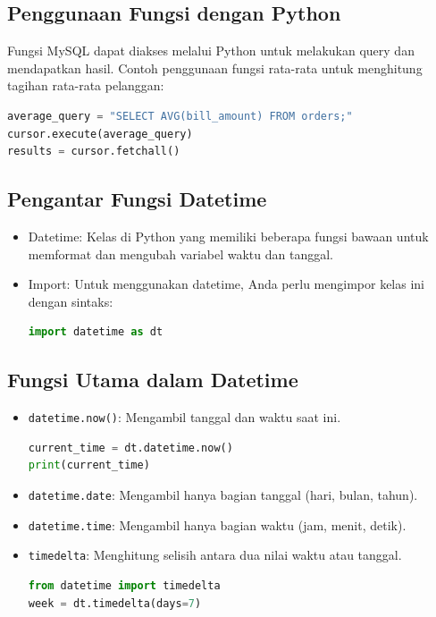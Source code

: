 \documentclass{article}
\begin{document}
\subsection{Penggunaan Fungsi dengan Python}
Fungsi MySQL dapat diakses melalui Python untuk melakukan query dan mendapatkan hasil. Contoh penggunaan fungsi rata-rata untuk menghitung tagihan rata-rata pelanggan:
\begin{lstlisting}[language=Python, caption={}, captionpos=b]
average_query = "SELECT AVG(bill_amount) FROM orders;"
cursor.execute(average_query)
results = cursor.fetchall()
\end{lstlisting}

\subsection{Pengantar Fungsi Datetime}
\begin{itemize}
      \item Datetime: Kelas di Python yang memiliki beberapa fungsi bawaan untuk memformat dan mengubah variabel waktu dan tanggal.
      \item Import: Untuk menggunakan datetime, Anda perlu mengimpor kelas ini dengan sintaks:
            \begin{lstlisting}[language=Python, caption={}, captionpos=b]
import datetime as dt
\end{lstlisting}
\end{itemize}

\subsection{Fungsi Utama dalam Datetime}
\begin{itemize}
      \item \verb|datetime.now()|: Mengambil tanggal dan waktu saat ini.
            \begin{lstlisting}[language=Python, caption={}, captionpos=b]
current_time = dt.datetime.now()
print(current_time)
\end{lstlisting}
      \item \verb|datetime.date|: Mengambil hanya bagian tanggal (hari, bulan, tahun).
      \item \verb|datetime.time|: Mengambil hanya bagian waktu (jam, menit, detik).
      \item \verb|timedelta|: Menghitung selisih antara dua nilai waktu atau tanggal.
            \begin{lstlisting}[language=Python, caption={}, captionpos=b]
from datetime import timedelta
week = dt.timedelta(days=7)
\end{lstlisting}
\end{itemize}
\end{document}
